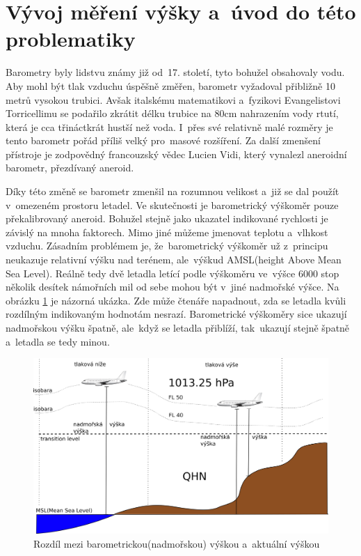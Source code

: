 		
	\section{Vývoj měření výšky a~úvod do této problematiky}
	
		Barometry byly lidstvu známy již od~17. století, tyto bohužel obsahovaly vodu. Aby mohl být tlak vzduchu úspěšně změřen, barometr vyžadoval přibližně 10 metrů vysokou trubici. Avšak italskému matematikovi a~fyzikovi Evangelistovi Torricellimu se podařilo zkrátit délku trubice na 80cm nahrazením vody rtutí, která je cca třináctkrát hustší než voda. I~přes své relativně malé rozměry je tento barometr pořád příliš velký pro~masové rozšíření. Za další zmenšení přístroje je zodpovědný francouzský vědec Lucien Vidi, který vynalezl aneroidní barometr, přezdívaný aneroid\cite{history::aneroid}.\par
		Díky této změně se barometr zmenšil na rozumnou velikost a~již se dal použít v~omezeném prostoru letadel. Ve skutečnosti je barometrický výškoměr pouze překalibrovaný aneroid. Bohužel stejně jako ukazatel indikované rychlosti je závislý na mnoha faktorech. Mimo jiné můžeme jmenovat teplotu a~vlhkost vzduchu. Zásadním problémem je, že~barometrický výškoměr už z~principu neukazuje relativní výšku nad terénem, ale~výškud AMSL(height Above Mean Sea Level). Reálně tedy dvě letadla letící podle výškoměru ve~výšce 6000 stop několik desítek námořních mil od sebe mohou být v~jiné nadmořské výšce. Na obrázku \ref{historie::vyvojMereniVysky::FL} je názorná ukázka. Zde může čtenáře napadnout, zda se letadla kvůli rozdílným indikovaným hodnotám nesrazí. Barometrické výškoměry sice ukazují nadmořskou výšku špatně, ale~když se letadla přiblíží, tak~ukazují stejně špatně a~letadla se tedy minou.\par
		
		\begin{figure}[H]
			\begin{center}
				\includegraphics[scale=0.75]{obrazky-figures/flight_level.png}
				\caption{Rozdíl mezi barometrickou(nadmořskou) výškou a~aktuální výškou}\label{historie::vyvojMereniVysky::FL}
			\end{center}
		\end{figure}
				
